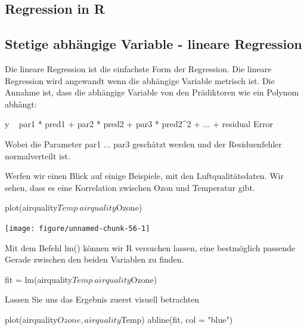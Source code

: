 \documentclass[a4paper,twoside]{tufte-book}\usepackage[]{graphicx}\usepackage[]{color}
\begin{document}
\begin{appendices}
\section{Regression in R}

\subsection{Stetige abhängige Variable - lineare Regression}

Die lineare Regression ist die einfachste Form der Regression. Die lineare Regression wird angewandt wenn die abhängige Variable metrisch ist. Die Annahme ist, dass die abhängige Variable von den Prädiktoren wie ein Polynom abhängt:

\begin{Schunk}
\begin{Sinput}
y ~ par1 * pred1 +  par2 * pred2 +  par3 * pred2^2 + ... + residual Error
\end{Sinput}
\end{Schunk}

Wobei die Parameter par1 ... par3 geschätzt werden und der Residuenfehler normalverteilt ist.

Werfen wir einen Blick auf einige Beispiele, mit den Luftqualitätsdaten. Wir sehen, dass es eine Korrelation zwischen Ozon und Temperatur gibt.

\begin{Schunk}
\begin{Sinput}
plot(airquality$Temp~airquality$Ozone)
\end{Sinput}

\texttt{[image: figure/unnamed-chunk-56-1]} \end{Schunk}

Mit dem Befehl lm() können wir R versuchen lassen, eine bestmöglich passende Gerade zwischen den beiden Variablen zu finden.

\begin{Schunk}
\begin{Sinput}
fit = lm(airquality$Temp~airquality$Ozone)
\end{Sinput}
\end{Schunk}

Lassen Sie uns das Ergebnis zuerst visuell betrachten

\begin{Schunk}
\begin{Sinput}
plot(airquality$Ozone, airquality$Temp)
abline(fit, col = "blue")
\end{Sinput}


\end{Schunk}
\end{appendices}
\end{document}
